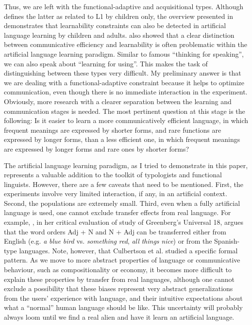 \documentclass[output=paper]{langsci/langscibook}
\begin{document}
Thus, we are left with the functional-adaptive and acquisitional types. Although  defines the latter as related to L1 by children only, the overview presented in  demonstrates that learnability constraints can also be detected in artificial language learning by children and adults.  also showed that a clear distinction between communicative efficiency and learnability is often problematic within the artificial language learning paradigm. Similar to  famous “thinking for speaking”, we can also speak about “learning for using”. This makes the task of distinguishing between these types very difficult. My preliminary answer is that we are dealing with a functional-adaptive constraint because it helps to optimize communication, even though there is no immediate interaction in the experiment. Obviously, more research with a clearer separation between the learning and communication stages is needed. The most pertinent question at this stage is the following: Is it easier to learn a more communicatively efficient language, in which frequent meanings are expressed by shorter forms, and rare functions are expressed by longer forms, than a less efficient one, in which frequent meanings are expressed by longer forms and rare ones by shorter forms?

The artificial language learning paradigm, as I tried to demonstrate in this paper, represents a valuable addition to the toolkit of typologists and functional linguists. However, there are a few caveats that need to be mentioned. First, the experiments involve very limited interaction, if any, in an artificial context. Second, the populations are extremely small. Third, even when a fully artificial language is used, one cannot exclude transfer effects from real language. For example, \citet{Goldberg2013}, in her critical evaluation of  study of Greenberg’s Universal 18, argues that the word orders Adj + N and N + Adj can be transferred either from English (e.g. \textit{a} \textit{blue} \textit{bird} vs. \textit{something} \textit{red}, \textit{all} \textit{things} \textit{nice}) or from the Spanish-type languages. Note, however, that Culbertson et al. studied a specific formal pattern. As we move to more abstract properties of language or communicative behaviour, such as compositionality or economy, it becomes more difficult to explain these properties by transfer from real languages, although one cannot exclude a possibility that these biases represent very abstract generalizations from the users’ experience with language, and their intuitive expectations about what a “normal” human language should be like. This uncertainty will probably always loom until we find a real alien and have it learn an artificial language. 
\end{document}
